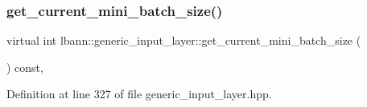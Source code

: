 \subsubsection{\texorpdfstring{get\+\_\+current\+\_\+mini\+\_\+batch\+\_\+size()}{get\_current\_mini\_batch\_size()}\hspace{0.1cm}{\footnotesize\ttfamily [2/2]}}
{\footnotesize\ttfamily virtual int lbann\+::generic\+\_\+input\+\_\+layer\+::get\+\_\+current\+\_\+mini\+\_\+batch\+\_\+size (\begin{DoxyParamCaption}{ }\end{DoxyParamCaption}) const\hspace{0.3cm}{\ttfamily [inline]}, {\ttfamily [virtual]}}



Definition at line 327 of file generic\+\_\+input\+\_\+layer.\+hpp.


